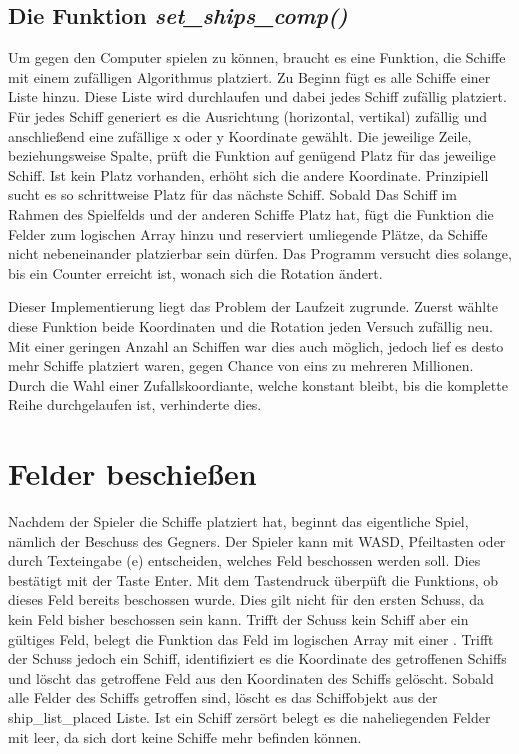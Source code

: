 \documentclass{llncs}
\begin{document}
\subsection{Die Funktion \emph{set\_ships\_comp()}}

Um gegen den Computer spielen zu können, braucht es eine Funktion, die Schiffe mit einem zufälligen Algorithmus platziert. Zu Beginn fügt es alle Schiffe einer Liste hinzu.
Diese Liste wird durchlaufen und dabei jedes Schiff zufällig platziert. Für jedes Schiff generiert es die Ausrichtung (horizontal, vertikal) zufällig und anschließend eine 
zufällige x oder y Koordinate gewählt. Die jeweilige Zeile, beziehungsweise Spalte, prüft die Funktion auf genügend Platz für das jeweilige Schiff.
Ist kein Platz vorhanden, erhöht sich die andere Koordinate. Prinzipiell sucht es so schrittweise Platz für das nächste Schiff. Sobald Das Schiff im Rahmen des Spielfelds
und der anderen Schiffe Platz hat, fügt die Funktion die Felder zum logischen Array hinzu und reserviert umliegende Plätze, da Schiffe nicht nebeneinander platzierbar sein dürfen.
Das Programm versucht dies solange, bis ein Counter erreicht ist, wonach sich die Rotation ändert.

Dieser Implementierung liegt das Problem der Laufzeit zugrunde. Zuerst wählte diese Funktion beide Koordinaten und die Rotation jeden Versuch zufällig neu. Mit einer geringen Anzahl
an Schiffen war dies auch möglich, jedoch lief es desto mehr Schiffe platziert waren, gegen Chance von eins zu mehreren Millionen. Durch die Wahl einer Zufallskoordiante, welche konstant bleibt,
bis die komplette Reihe durchgelaufen ist, verhinderte dies. 

\section{Felder beschießen}

Nachdem der Spieler die Schiffe platziert hat, beginnt das eigentliche Spiel, nämlich der Beschuss des Gegners. Der Spieler kann mit WASD, Pfeiltasten oder durch Texteingabe (e) entscheiden,
welches Feld beschossen werden soll. Dies bestätigt mit der Taste \glqq Enter\grqq{}. Mit dem Tastendruck überpüft die Funktions, ob dieses Feld bereits beschossen wurde.
Dies gilt nicht für den ersten Schuss, da kein Feld bisher beschossen sein kann. Trifft der Schuss kein Schiff aber ein gültiges Feld, belegt die Funktion das Feld im logischen Array mit einer \grqq{}.
Trifft der Schuss jedoch ein Schiff, identifiziert es die Koordinate des getroffenen Schiffs und löscht das getroffene Feld aus den Koordinaten des Schiffs gelöscht.
Sobald alle Felder des Schiffs getroffen sind, löscht es das Schiffobjekt aus der ship\_list\_placed Liste. Ist ein Schiff zersört belegt es die naheliegenden Felder mit leer,
da sich dort keine Schiffe mehr befinden können.
\end{document}
